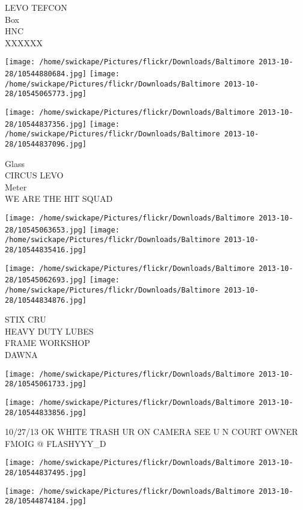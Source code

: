 \documentclass[10pt,letterpaper]{article}
\begin{document}
LEVO TEFCON\\
Box\\
HNC\\
XXXXXX\\
\pagebreak

\texttt{[image: /home/swickape/Pictures/flickr/Downloads/Baltimore 2013-10-28/10544880684.jpg]}
\texttt{[image: /home/swickape/Pictures/flickr/Downloads/Baltimore 2013-10-28/10545065773.jpg]}

\texttt{[image: /home/swickape/Pictures/flickr/Downloads/Baltimore 2013-10-28/10544837356.jpg]}
\texttt{[image: /home/swickape/Pictures/flickr/Downloads/Baltimore 2013-10-28/10544837096.jpg]}

Glass\\
CIRCUS LEVO\\
Meter\\
WE ARE THE HIT SQUAD\\
\pagebreak

\texttt{[image: /home/swickape/Pictures/flickr/Downloads/Baltimore 2013-10-28/10545063653.jpg]}
\texttt{[image: /home/swickape/Pictures/flickr/Downloads/Baltimore 2013-10-28/10544835416.jpg]}

\texttt{[image: /home/swickape/Pictures/flickr/Downloads/Baltimore 2013-10-28/10545062693.jpg]}
\texttt{[image: /home/swickape/Pictures/flickr/Downloads/Baltimore 2013-10-28/10544834876.jpg]}

STIX CRU\\
HEAVY DUTY LUBES\\
FRAME WORKSHOP\\
DAWNA\\
\pagebreak

\texttt{[image: /home/swickape/Pictures/flickr/Downloads/Baltimore 2013-10-28/10545061733.jpg]}

\vspace{0.25in}
\texttt{[image: /home/swickape/Pictures/flickr/Downloads/Baltimore 2013-10-28/10544833856.jpg]}

10/27/13 OK WHITE TRASH UR ON CAMERA SEE U N COURT OWNER\\
FMOIG @ FLASHYYY\_D\\
\pagebreak

\texttt{[image: /home/swickape/Pictures/flickr/Downloads/Baltimore 2013-10-28/10544837495.jpg]}

\vspace{0.25in}
\texttt{[image: /home/swickape/Pictures/flickr/Downloads/Baltimore 2013-10-28/10544874184.jpg]}
\end{document}
